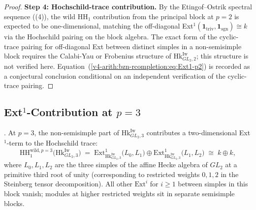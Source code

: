 \begin{proof}
\medskip\noindent\textbf{Step 4: Hochschild-trace contribution.} By the
Etingof--Ostrik spectral sequence
((4)), the wild
\(\mathrm{HH}_{1}\) contribution from the principal block at \(p=2\)
is expected to be one-dimensional, matching the off-diagonal
Ext\({}^{1}(\mathbf{1}_{\mathrm{triv}},\mathbf{1}_{\mathrm{sgn}})\cong k\)
via the Hochschild pairing on the block algebra. The exact form of
the cyclic-trace pairing for off-diagonal Ext between distinct simples
in a non-semisimple block requires the Calabi-Yau or Frobenius
structure of \(\mathrm{Hk}^{\mathrm{Iw}}_{GL_{2},2}\); this structure
is not verified here. Equation~(\ref{v4-arith:bzn-rcompletion:eq:Ext1-p2})
is recorded as a conjectural conclusion conditional on an independent
verification of the cyclic-trace pairing.
\end{proof}

\subsection{Ext\({}^{1}\)-Contribution at \(p=3\)}

\begin{proposition}[Ext\({}^{1}\) at \(p=3\)]
\label{v4-arith:bzn-rcompletion:prop:R4-Ext1-p3}
\ClaimStatusConjectured. At \(p=3\), the non-semisimple part of
\(\mathrm{Hk}^{\mathrm{Iw}}_{GL_{2},3}\) contributes a
two-dimensional Ext\({}^{1}\)-term to the Hochschild trace:
\begin{equation}
\label{v4-arith:bzn-rcompletion:eq:Ext1-p3}
\mathrm{HH}_{1}^{\mathrm{wild},p=3}\bigl(\mathrm{Hk}^{\mathrm{Iw}}_{GL_{2},3}\bigr)
\;=\;\mathrm{Ext}^{1}_{\mathrm{Hk}^{\mathrm{Iw}}_{GL_{2},3}}\bigl(L_{0},L_{1}\bigr)\oplus\mathrm{Ext}^{1}_{\mathrm{Hk}^{\mathrm{Iw}}_{GL_{2},3}}\bigl(L_{1},L_{2}\bigr)
\;\cong\;k\oplus k,
\end{equation}
where \(L_{0},L_{1},L_{2}\) are the three simples of the
affine Hecke algebra of \(GL_{2}\) at a primitive third root of
unity (corresponding to restricted weights \(0,1,2\) in the
Steinberg tensor decomposition). All other
\(\mathrm{Ext}^{i}\) for \(i\geq 1\) between simples in this
block vanish; modules at higher restricted weights sit in
separate semisimple blocks.
\end{proposition}

